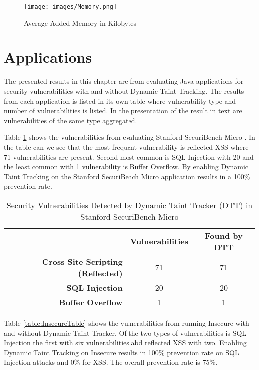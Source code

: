 \begin{figure}[!hbt]
	\centering
	\texttt{[image: images/Memory.png]}
	\caption{Average Added Memory in Kilobytes}
	\label{fig:Memory}
\end{figure}



\section{Applications}
\label{Applications}
The presented results in this chapter are from evaluating Java applications for security vulnerabilities with and without Dynamic Taint Tracking. The results from each application is listed in its own table where vulnerability type and number of vulnerabilities is listed. In the presentation of the result in text are vulnerabilities of the same type aggregated.

Table \ref{table:MicroTable} shows the vulnerabilities from evaluating Stanford SecuriBench Micro \parencite{securiBenchMicro}. In the table can we see that the most frequent vulnerability is reflected XSS where 71 vulnerabilities are present. Second most common is SQL Injection with 20 and the least common with 1 vulnerability is Buffer Overflow. By enabling Dynamic Taint Tracking on the Stanford SecuriBench Micro \parencite{securiBenchMicro} application results in a 100\% prevention rate.

\begin{table}[!hbt]
  \centering
  \caption{Security Vulnerabilities Detected by Dynamic Taint Tracker (DTT) in Stanford SecuriBench Micro}
  \label{table:MicroTable}
    \begin{tabular}{rcc}
      & \textbf{Vulnerabilities} & \textbf{Found by DTT} \\
      \textbf{Cross Site Scripting (Reflected)} & 71            & 71  \\
      \textbf{SQL Injection}                    & 20            & 20  \\
      \textbf{Buffer Overflow}                  & 1             & 1  
    \end{tabular}
\end{table}

Table \ref{table:InsecureTable} shows the vulnerabilities from running Insecure \parencite{insecure} with and without Dynamic Taint Tracker. Of the two types of vulnerabilities is SQL Injection the first with six vulnerabilities abd reflected XSS with two. Enabling Dynamic Taint Tracking on Insecure \parencite{insecure} results in 100\% prevention rate on SQL Injection attacks and 0\% for XSS. The overall prevention rate is 75\%. 

